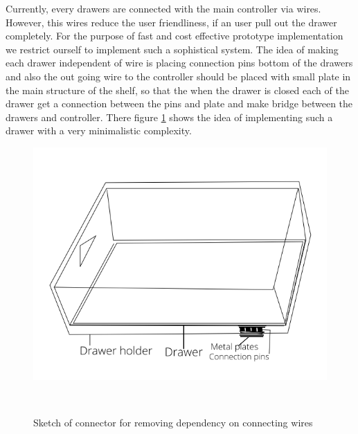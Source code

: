 Currently, every drawers are connected with the main controller via wires. However, this wires reduce the user friendliness, if an user pull out the drawer completely. For the purpose of fast and cost effective prototype implementation we restrict ourself to implement such a sophistical system. The idea of making each drawer independent of wire is placing connection pins bottom of the drawers and also the out going wire to the controller 
should be placed with small plate in the main structure of the shelf, so that the when the drawer is closed each of the drawer get a connection between the pins and plate and make bridge between the drawers and controller.
There figure \ref{fig:connector} shows the idea of implementing such a drawer with a very minimalistic complexity.
%
\begin{figure}
	\includegraphics[width=1\columnwidth]{figures/example_drawer}
	\caption{Sketch of connector for removing dependency on connecting wires}~\label{fig:connector}
\end{figure}
%